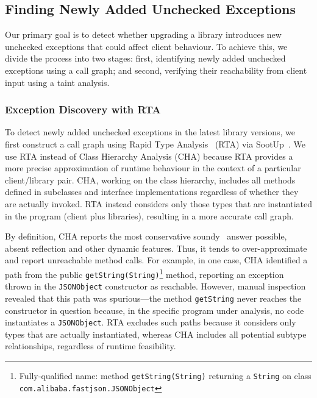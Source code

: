 \subsection{Finding Newly Added Unchecked Exceptions}

Our primary goal is to detect whether upgrading a library introduces new unchecked exceptions that could affect client behaviour. To achieve this, we divide the process into two stages: first, identifying newly added unchecked exceptions using a call graph; and second, verifying their reachability from client input using a taint analysis.

\subsubsection{Exception Discovery with RTA}

To detect newly added unchecked exceptions in the latest library versions, we first construct a call graph using Rapid Type Analysis~\cite{bacon96:_fast_static_analy_c_virtual_funct_calls} (RTA) via SootUp~\cite{Karakaya24:_sootup}. We use RTA instead of Class Hierarchy Analysis (CHA) because RTA provides a more precise approximation of runtime behaviour in the context of a particular client/library pair. CHA, working on the class hierarchy, includes all methods defined in subclasses and interface implementations regardless of whether they are actually invoked. RTA instead considers only those types that are instantiated in the program (client plus libraries), resulting in a more accurate call graph.

By definition, CHA reports the most conservative soundy~\cite{livshits15:_in} answer possible, absent reflection and other dynamic features. Thus, it tends to over-approximate and report unreachable method calls. For example, in one case, CHA identified a path from the public \texttt{getString(String)}\footnote{Fully-qualified name: method \texttt{getString(String)} returning a \texttt{String} on class \texttt{com.alibaba.fastjson.JSONObject}} method, reporting an exception thrown in the \texttt{JSONObject} constructor as reachable. However, manual inspection revealed that this path was spurious—the method \texttt{getString} never reaches the constructor in question because, in the specific program under analysis, no code instantiates a \texttt{JSONObject}. RTA excludes such paths because it considers only types that are actually instantiated, whereas CHA includes all potential subtype relationships, regardless of runtime feasibility.

